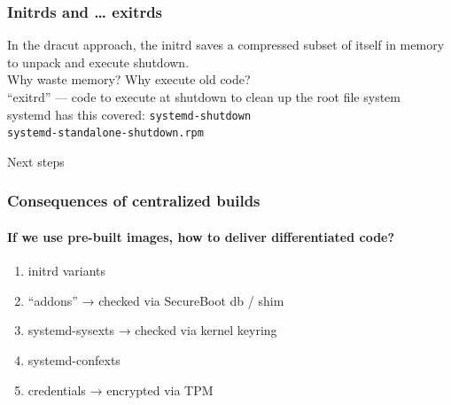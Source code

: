 \documentclass[]{beamer}
\newcommand\pp{}
\newcommand{\secsec}[1]{\begin{frame}[c]\Huge \textsc #1\end{frame}}
\begin{document}
\begin{frame}[fragile]
  \frametitle{Initrds and … exitrds}

  \pp
  In the dracut approach, the initrd saves a compressed subset of itself in memory to unpack and execute shutdown.
  \\

  \pp
  Why waste memory? Why execute old code?
  \\

  \pp
  ``exitrd'' — code to execute at shutdown to clean up the root file system
  \\

  \pp
  systemd has this covered: \texttt{systemd-shutdown}\\
  \texttt{systemd-standalone-shutdown.rpm}
\end{frame}

\secsec{Next steps}

\begin{frame}
  \frametitle{Consequences of centralized builds}
  \framesubtitle{If we use pre-built images, how to deliver differentiated code?}
  \pp

  \begin{enumerate}
    \addtocounter{enumi}{-1}
  \item initrd variants\pp
  \item ``addons'' → checked via SecureBoot db / shim
    \pp
  \item systemd-sysexts → checked via kernel keyring
  \item systemd-confexts
    \pp
  \item credentials → encrypted via TPM
  \end{enumerate}


\end{frame}


\end{document}
